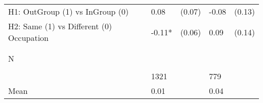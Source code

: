 \begin{tabular}{l*{4}{l}}
H1: OutGroup (1) vs InGroup (0)&     0.08   &   (0.07)&    -0.08   &   (0.13)\\
 
H2: Same (1) vs Different (0) Occupation&    -0.11*  &   (0.06)&     0.09   &   (0.14)\\
 
  \\\\[-0.5cm] N \\\\[-0.6cm]&     1321   &         &      779   &         \\
Mean            &     0.01&         &     0.04&         \\
 
\bottomrule  \end{tabular}  
